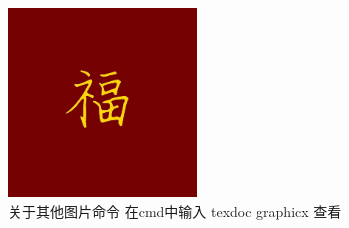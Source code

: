 \documentclass[UTF8]{article}
\begin{document}
\begin{center}
	\includegraphics[width=5cm,angle=90]{fu}\\
	
	关于其他图片命令   在cmd中输入  texdoc graphicx 查看
\end{center}
\end{document}
